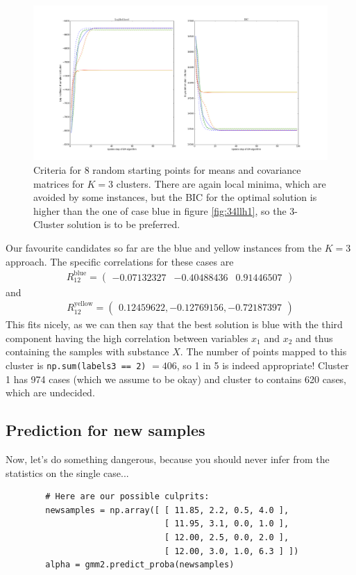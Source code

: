 \begin{figure}[H]
	\centering \includegraphics{../Figures/Ex3_4_llh2.png}
	\caption{Criteria for 8 random starting points for means and covariance matrices for $K=3$ clusters. There are again local minima, which are avoided by some instances, but the BIC for the optimal solution is higher than the one of case blue in figure \ref{fig:34llh1}, so the 3-Cluster solution is to be preferred.}
	\label{fig:34llh2}
\end{figure}

Our favourite candidates so far are the blue and yellow instances from the $K=3$ approach. The specific  correlations for these cases are
\begin{align}
R_{12}^{\mathrm{blue}} = \begin{pmatrix}
-0.07132327 & -0.40488436 &  0.91446507
\end{pmatrix}
\end{align}
and \begin{align}
R_{12}^{\mathrm{yellow}} = 
\begin{pmatrix}
0.12459622, -0.12769156, -0.72187397
\end{pmatrix}
\end{align}
This fits nicely, as we can then say that the best solution is blue with the third component having the high correlation between variables $x_1$ and $x_2$ and thus containing the samples with substance $X$. The number of points mapped to this cluster is \texttt{np.sum(labels3 == 2)} $ = 406$, so 1 in 5 is indeed appropriate! Cluster 1 has 974 cases (which we assume to be okay) and cluster to contains 620 cases, which are undecided.

\subsection{Prediction for new samples}
Now, let's do something dangerous, because you should never infer from the statistics on the single case...
\begin{verbatim}
        # Here are our possible culprits:
        newsamples = np.array([ [ 11.85, 2.2, 0.5, 4.0 ],
                                [ 11.95, 3.1, 0.0, 1.0 ],
                                [ 12.00, 2.5, 0.0, 2.0 ],
                                [ 12.00, 3.0, 1.0, 6.3 ] ])
        alpha = gmm2.predict_proba(newsamples)
\end{verbatim}

